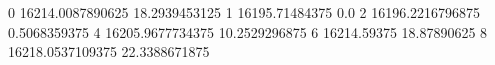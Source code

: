 0 16214.0087890625 18.2939453125
1 16195.71484375 0.0
2 16196.2216796875 0.5068359375
4 16205.9677734375 10.2529296875
6 16214.59375 18.87890625
8 16218.0537109375 22.3388671875
